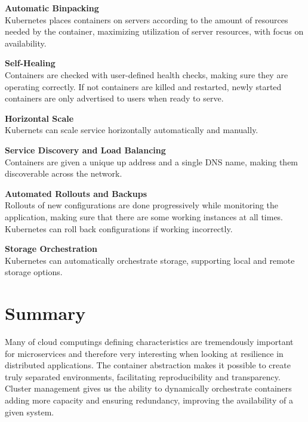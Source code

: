\textbf{Automatic Binpacking}\\
Kubernetes places containers on servers according to the amount of resources needed by the container, maximizing utilization of server resources, with focus on availability.

\textbf{Self-Healing}\\
Containers are checked with user-defined health checks, making sure they are operating correctly. If not containers are killed and restarted, newly started containers are only advertised to users when ready to serve.

\textbf{Horizontal Scale}\\
Kubernets can scale service horizontally automatically and manually.

\textbf{Service Discovery and Load Balancing}\\
Containers are given a unique up address and a single DNS name, making them discoverable across the network.

\textbf{Automated Rollouts and Backups}\\
Rollouts of new configurations are done progressively while monitoring the application, making sure that there are some working instances at all times. Kubernetes can roll back configurations if working incorrectly.

\textbf{Storage Orchestration}\\
Kubernetes can automatically orchestrate storage, supporting local and remote storage options.


\section{Summary}
Many of cloud computings defining characteristics are tremendously important for microservices and therefore very interesting when looking at resilience in distributed applications. The container abstraction makes it possible to create truly separated environments, facilitating reproducibility and transparency. Cluster management gives us the ability to dynamically orchestrate containers adding more capacity and ensuring redundancy, improving the availability of a given system.